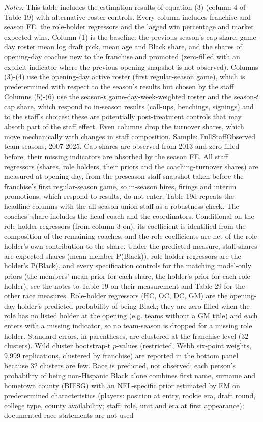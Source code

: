 {\footnotesize
\noindent\textit{Notes:} This table includes the estimation results of equation (3) (column 4 of Table 19) with alternative roster controls. Every column includes franchise and season FE, the role-holder regressors and the lagged win percentage and market expected wins. Column (1) is the baseline: the previous season's cap share, game-day roster mean log draft pick, mean age and Black share, and the shares of opening-day coaches new to the franchise and promoted (zero-filled with an explicit indicator where the previous opening snapshot is not observed). Columns (3)-(4) use the opening-day active roster (first regular-season game), which is predetermined with respect to the season's results but chosen by the staff. Columns (5)-(6) use the season-$t$ game-day-week-weighted roster and the season-$t$ cap share, which respond to in-season results (call-ups, benchings, signings) and to the staff's choices: these are potentially post-treatment controls that may absorb part of the staff effect. Even columns drop the turnover shares, which move mechanically with changes in staff composition. Sample: FullStaffObserved team-seasons, 2007-2025. Cap shares are observed from 2013 and zero-filled before; their missing indicators are absorbed by the season FE. All staff regressors (shares, role holders, their priors and the coaching-turnover shares) are measured at opening day, from the preseason staff snapshot taken before the franchise's first regular-season game, so in-season hires, firings and interim promotions, which respond to results, do not enter; Table 19d repeats the headline columns with the all-season union staff as a robustness check. The coaches' share includes the head coach and the coordinators. Conditional on the role-holder regressors (from column 3 on), its coefficient is identified from the composition of the remaining coaches, and the role coefficients are net of the role holder's own contribution to the share. Under the predicted measure, staff shares are expected shares (mean member P(Black)), role-holder regressors are the holder's P(Black), and every specification controls for the matching model-only priors (the members' mean prior for each share, the holder's prior for each role holder); see the notes to Table 19 on their measurement and Table 29 for the other race measures. Role-holder regressors (HC, OC, DC, GM) are the opening-day holder's predicted probability of being Black; they are zero-filled when the role has no listed holder at the opening (e.g. teams without a GM title) and each enters with a missing indicator, so no team-season is dropped for a missing role holder. Standard errors, in parentheses, are clustered at the franchise level (32 clusters). Wild cluster bootstrap-t $p$-values (restricted, Webb six-point weights, 9,999 replications, clustered by franchise) are reported in the bottom panel because 32 clusters are few. Race is predicted, not observed: each person's probability of being non-Hispanic Black alone combines first name, surname and hometown county (BIFSG) with an NFL-specific prior estimated by EM on predetermined characteristics (players: position at entry, rookie era, draft round, college type, county availability; staff: role, unit and era at first appearance); documented race statements are not used }
